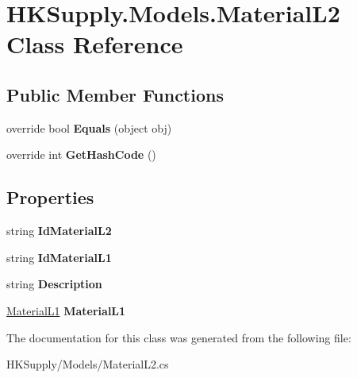 \hypertarget{class_h_k_supply_1_1_models_1_1_material_l2}{}\section{H\+K\+Supply.\+Models.\+Material\+L2 Class Reference}
\label{class_h_k_supply_1_1_models_1_1_material_l2}
\subsection*{Public Member Functions}
\begin{DoxyCompactItemize}
\item 
\mbox{\label{class_h_k_supply_1_1_models_1_1_material_l2_ab2c903ca8d2e2c699bc98a5a19f1761e}} 
override bool {\bfseries Equals} (object obj)
\item 
\mbox{\label{class_h_k_supply_1_1_models_1_1_material_l2_a778bab6427405f2c413b63e6e1246029}} 
override int {\bfseries Get\+Hash\+Code} ()
\end{DoxyCompactItemize}
\subsection*{Properties}
\begin{DoxyCompactItemize}
\item 
\mbox{\label{class_h_k_supply_1_1_models_1_1_material_l2_afeea9bd516c2823bd810ea65e0a582d1}} 
string {\bfseries Id\+Material\+L2}
\item 
\mbox{\label{class_h_k_supply_1_1_models_1_1_material_l2_aba7b95b73c402850de857c875c772932}} 
string {\bfseries Id\+Material\+L1}
\item 
\mbox{\label{class_h_k_supply_1_1_models_1_1_material_l2_af84454c867c0ca4c0f364fa22f91ce18}} 
string {\bfseries Description}
\item 
\mbox{\label{class_h_k_supply_1_1_models_1_1_material_l2_a43ca047ae261e4b84541e0c6bb46f4c1}} 
\mbox{\hyperlink{class_h_k_supply_1_1_models_1_1_material_l1}{Material\+L1}} {\bfseries Material\+L1}
\end{DoxyCompactItemize}


The documentation for this class was generated from the following file\+:\begin{DoxyCompactItemize}
\item 
H\+K\+Supply/\+Models/Material\+L2.\+cs\end{DoxyCompactItemize}

